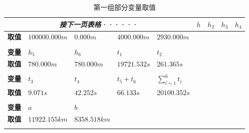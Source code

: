 \begin{longtable}{|c|*{4}{>{\centering\arraybackslash}X|}}
    \endhead
    \endfirsthead
    \multicolumn{5}{c}{\itshape 接下一页表格······}
    \endfoot
    \endlastfoot
    \hline
    \textbf{变量} & $h$           & $h_2$        & $h_3$         & $h_4$               \\
    \hline
    \textbf{取值} & $100000.000m$ & $0.000m$ & $4000.000m$   & $2930.000m$         \\
    \hline
    \multicolumn{5}{c}{}                                                               \\[-7pt]
    \hline
    \textbf{变量} & $h_5$         & $h_6$        & $t_1$         & $t_2$               \\
    \hline
    \textbf{取值} & $780.000m$   & $780.000m$  & $19721.532s$  & $261.365s$          \\
    \hline
    \multicolumn{5}{c}{}                                                               \\[-7pt]
    \hline
    \textbf{变量} & $t_3$         & $t_4$        & $t_5 + t_6$   & $\sum_{i=1}^{6}t_i$ \\
    \hline
    \textbf{取值} & $9.071s$      & $42.252s$     & $66.133s$    & $20100.352s$        \\
    \hline
    \multicolumn{5}{c}{}                                                               \\[-7pt]
    \cline{1-4}
    \textbf{变量} & $a$         & $b$        & \multicolumn{1}{c|}{$c$}               \\
    \cline{1-4}
    \textbf{取值} & $11922.155km$   & $8358.518km$ & \multicolumn{1}{c|}{$8501.350km$}  \\
    \cline{1-4}
    \caption{第一组部分变量取值}
    \label{tab:2}
\end{longtable}